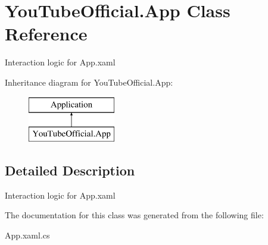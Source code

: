 \hypertarget{class_you_tube_official_1_1_app}{}\section{You\+Tube\+Official.\+App Class Reference}
\label{class_you_tube_official_1_1_app}


Interaction logic for App.\+xaml  


Inheritance diagram for You\+Tube\+Official.\+App\+:\begin{figure}[H]
\begin{center}
\leavevmode
\includegraphics[height=2.000000cm]{class_you_tube_official_1_1_app}
\end{center}
\end{figure}


\subsection{Detailed Description}
Interaction logic for App.\+xaml 



The documentation for this class was generated from the following file\+:\begin{DoxyCompactItemize}
\item 
App.\+xaml.\+cs\end{DoxyCompactItemize}
